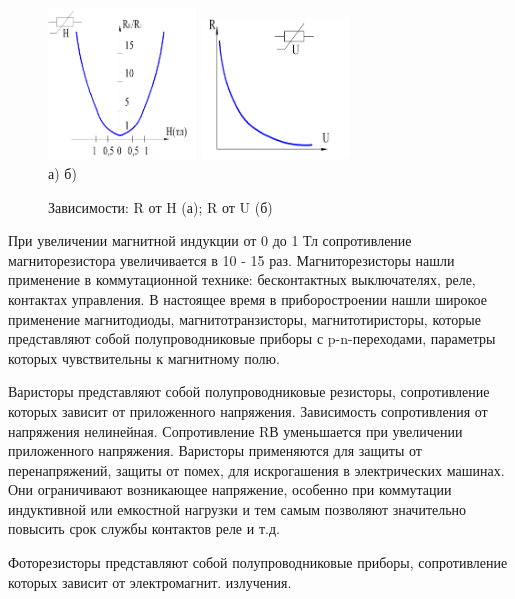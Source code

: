 \documentclass[unicode, 12pt, a4paper, oneside]{article}
\begin{document}
\begin{figure}[H]
\centering
\includegraphics[width=0.35\textwidth]{4_R(H).png}
\hspace{1cm}
\includegraphics[width=0.35\textwidth]{4_R(U).png}
\\а) \hspace{0.4\textwidth} б)
\caption{Зависимости: R от H (а); R от U (б)}
\label{fig:4_R(U/H)}
\end{figure}

При увеличении магнитной индукции от 0 до 1 Тл сопротивление магниторезистора увеличивается в 10 - 15 раз. Магниторезисторы нашли применение в коммутационной технике: бесконтактных выключателях, реле, контактах управления. В настоящее время в приборостроении нашли широкое применение магнитодиоды, магнитотранзисторы, магнитотиристоры, которые представляют собой полупроводниковые приборы с p-n-переходами, параметры которых чувствительны к магнитному полю.

Варисторы представляют собой полупроводниковые резисторы, сопротивление которых зависит от приложенного напряжения. Зависимость сопротивления от напряжения нелинейная. Сопротивление RВ уменьшается при увеличении приложенного напряжения. Варисторы применяются для защиты от перенапряжений, защиты от помех, для искрогашения в электрических машинах. Они ограничивают возникающее напряжение, особенно при коммутации индуктивной или емкостной нагрузки и тем самым позволяют значительно повысить срок службы контактов реле и т.д.

Фоторезисторы представляют собой полупроводниковые приборы, сопротивление которых зависит от электромагнит. излучения.
\end{document}
